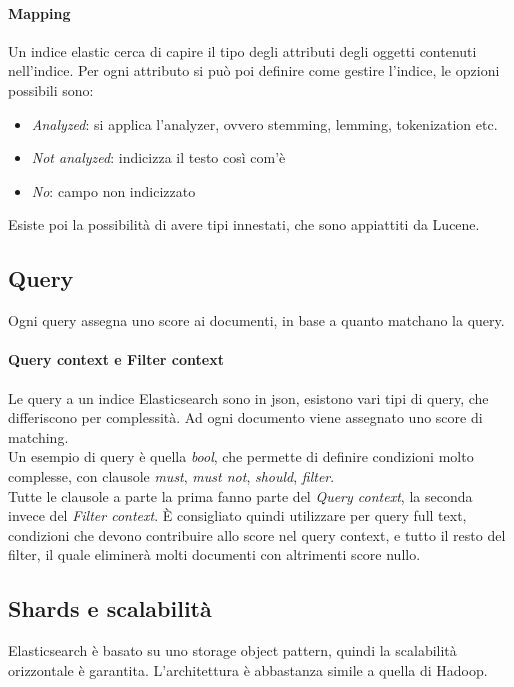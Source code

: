 \paragraph{Mapping}
Un indice elastic cerca di capire il tipo degli attributi degli oggetti contenuti nell'indice.
Per ogni attributo si può poi definire come gestire l'indice, le opzioni possibili sono:
\begin{itemize}
    \item \emph{Analyzed}: si applica l'analyzer, ovvero stemming, lemming, tokenization etc.
    \item \emph{Not analyzed}: indicizza il testo così com'è
    \item \emph{No}: campo non indicizzato
\end{itemize}
Esiste poi la possibilità di avere tipi innestati, che sono appiattiti da Lucene.

\subsection{Query}
Ogni query assegna uno score ai documenti, in base a quanto matchano la query.

\paragraph{Query context e Filter context}
Le query a un indice Elasticsearch sono in json, esistono vari tipi di query, che differiscono 
per complessità. Ad ogni documento viene assegnato uno score di matching.\\
Un esempio di query è quella \emph{bool}, che permette di definire condizioni molto 
complesse, con clausole \emph{must}, \emph{must not}, \emph{should}, \emph{filter}.\\
Tutte le clausole a parte la prima fanno parte del \emph{Query context}, la seconda invece 
del \emph{Filter context}. È consigliato quindi utilizzare per query full text, condizioni 
che devono contribuire allo score nel query context, e tutto il resto del filter, il quale 
eliminerà molti documenti con altrimenti score nullo.

\subsection{Shards e scalabilità}
Elasticsearch è basato su uno storage object pattern, quindi la scalabilità orizzontale
è garantita.
L'architettura è abbastanza simile a quella di Hadoop.

